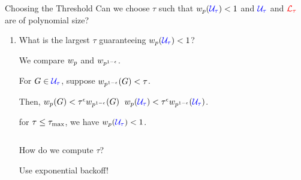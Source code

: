 \documentclass{beamer}
\def\spadding{\vspace{0.25cm}}
\newcommand*{\eqdef}{\overset{.}{=}}
\begin{document}
\begin{frame}{Choosing the Threshold}
Can we choose $\tau$ such that $w_p(\textcolor{blue}{\mathcal{U}_\tau}) < 1$ and $\textcolor{blue}{\mathcal{U}_\tau}$ and $\textcolor{red}{\mathcal{L}_\tau}$ are of polynomial size?\pause

\begin{enumerate}
    \item What is the largest $\tau$ guaranteeing $w_p(\textcolor{blue}{\mathcal{U}_\tau}) < 1$?\pause\spadding
    
    We compare $w_p$ and $w_{p^{1-\epsilon}}$.\pause\par
    For $G \in \textcolor{blue}{\mathcal{U}_\tau}$, suppose $w_{p^{1-\epsilon}}(G) < \tau$.\pause\par
    Then, $w_p(G) < \tau^\epsilon w_{p^{1-\epsilon}}(G)$\pause\ \follows $w_p(\textcolor{blue}{\mathcal{U}_\tau}) < \tau^\epsilon w_{p^{1-\epsilon}}(\textcolor{blue}{\mathcal{U}_\tau})$.\pause\par
    \follows for $\tau \leq \tau_\mathrm{max}$, we have $w_p(\textcolor{blue}{\mathcal{U}_\tau}) < 1$.\pause

    
    
    
    
    \vspace{0.3em}\begin{columns}[T]
    \begin{column}{0.4\textwidth}
    How do we compute $\tau$?\pause\par
    Use exponential backoff!
    

\end{column}
\end{columns}
\end{enumerate}
\end{frame}
\end{document}
